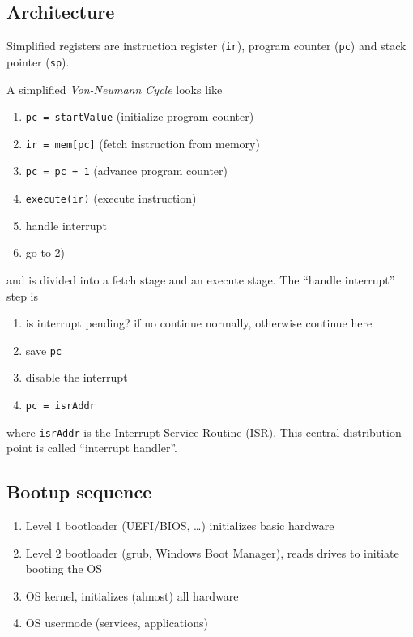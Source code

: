 \documentclass{article}
\newcommand{\code}[1]{\texttt{#1}}
\begin{document}
\begin{multicols}{1}

\section*{Architecture}

Simplified registers are instruction register (\code{ir}), program counter (\code{pc}) and stack pointer (\code{sp}).

A simplified \emph{Von-Neumann Cycle} looks like

\begin{enumerate}
    \item \code{pc = startValue} (initialize program counter)
    \item \code{ir = mem[pc]} (fetch instruction from memory)
    \item \code{pc = pc + 1} (advance program counter)
    \item \code{execute(ir)} (execute instruction)
    \item handle interrupt
    \item go to 2)
\end{enumerate}

and is divided into a fetch stage and an execute stage. The \enquote{handle interrupt} step is
\begin{enumerate}
    \item is interrupt pending? if no continue normally, otherwise continue here
    \item save \code{pc}
    \item disable the interrupt
    \item \code{pc = isrAddr}
\end{enumerate}
where \code{isrAddr} is the Interrupt Service Routine (ISR). This central distribution point is called \enquote{interrupt handler}.

\subsection*{Bootup sequence}
\begin{enumerate}
    \item Level 1 bootloader (UEFI/BIOS, \ldots) initializes basic hardware
    \item Level 2 bootloader (grub, Windows Boot Manager), reads drives to initiate booting the OS
    \item OS kernel, initializes (almost) all hardware
    \item OS usermode (services, applications)
\end{enumerate}


\end{multicols}
\end{document}
